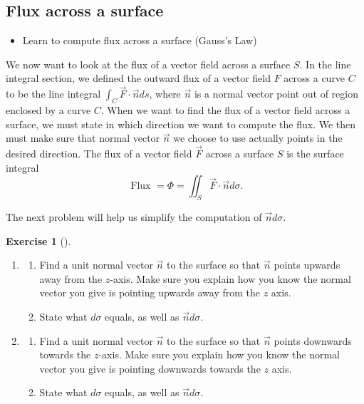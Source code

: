 \documentclass[10pt,]{book}
\theoremstyle{plain}
\theoremstyle{definition}
\theoremstyle{definition}
\theoremstyle{definition}
\theoremstyle{definition}
\newtheorem{exploration}[project]{Exercise}
\theoremstyle{definition}
\numberwithin{equation}{section}
\newcommand{\ds}{\displaystyle}
\begin{document}
\subsection[{Flux across a surface}]{Flux across a surface}\label{subsection-35}
\leavevmode%
\begin{itemize}[label=\textbullet]
\item{}Learn to compute flux across a surface (Gauss's Law)%
\end{itemize}
We now want to look at the flux of a vector field across a surface \(S\). In the line integral section, we defined the outward flux of a vector field \(F\) across a curve \(C\) to be the line integral \(\ds \int_C \vec F\cdot \vec n ds\), where \(\vec n\) is a normal vector point out of region enclosed by a curve \(C\). When we want to find the flux of a vector field across a surface, we must state in which direction we want to compute the flux. We then must make sure that normal vector \(\vec n\) we choose to use actually points in the desired direction. The flux of a vector field \(\vec F\) across a surface \(S\) is the surface integral%
\begin{equation*}
\text{ Flux } =\Phi 
= \iint_S \vec F\cdot \vec n d\sigma 
.
\end{equation*}
%
\par
The next problem will help us simplify the computation of \(\vec nd\sigma\).%
\begin{exploration}[]\label{exploration-283}
\leavevmode%
\begin{enumerate}[font=\bfseries,label=(\alph*),ref=\alph*]
\item\label{task-766} \begin{enumerate}[font=\bfseries,label=(\roman*),ref=\theenumi.\roman*]
\item\label{task-767} Find a unit normal vector \(\vec n\) to the surface so that \(\vec n\) points upwards away from the \(z\)-axis. Make sure you explain how you know the normal vector you give is pointing upwards away from the \(z\) axis.%
\item\label{task-768} State what \(d\sigma\) equals, as well as \(\vec n d\sigma\).%
\end{enumerate}
\item\label{task-769} \begin{enumerate}[font=\bfseries,label=(\roman*),ref=\theenumi.\roman*]
\item\label{task-770} Find a unit normal vector \(\vec n\) to the surface so that \(\vec n\) points downwards towards the \(z\)-axis. Make sure you explain how you know the normal vector you give is pointing downwards towards the \(z\) axis.%
\item\label{task-771} State what \(d\sigma\) equals, as well as \(\vec n d\sigma\).%
\end{enumerate}
\end{enumerate}
\end{exploration}
\end{document}
